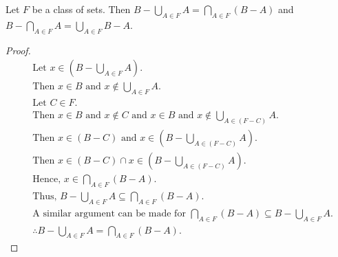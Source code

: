 \begin{question}
  Let $F$ be a class of sets. Then $B - \bigcup\limits_{A \in F}{A} = \bigcap\limits_{A \in F}{(B-A)}$ and $B - \bigcap\limits_{A \in F}{A} = \bigcup\limits_{A \in F}{B - A}$.
\end{question}
\begin{proof}
  \begin{align*}
    & \text{Let } x \in (B - \bigcup\limits_{A \in F}{A}). \\
    & \text{Then } x \in B \text{ and } x \not \in \bigcup\limits_{A \in F}{A}. \\
    & \text{Let } C \in F. \\
    & \text{Then } x \in B \text{ and } x \not \in C \text{ and } x \in B \text{ and } x \not \in \bigcup\limits_{A \in (F - C)}{A}. \\
    & \text{Then } x \in (B - C) \text{ and } x \in (B - \bigcup\limits_{A \in (F - C)}{A}). \\
    & \text{Then } x \in (B - C) \cap x \in (B - \bigcup\limits_{A \in (F - C)}{A}). \\
    & \text{Hence, } x \in \bigcap\limits_{A \in F}{(B-A)}. \\
    & \text{Thus, } B - \bigcup\limits_{A \in F}{A} \subseteq \bigcap\limits_{A \in F}{(B-A)}. \\
    & \text{A similar argument can be made for } \bigcap\limits_{A \in F}{(B-A)} \subseteq B - \bigcup\limits_{A \in F}{A}. \\
    & \therefore B - \bigcup\limits_{A \in F}{A} = \bigcap\limits_{A \in F}{(B-A)}.
  \end{align*}
\end{proof}

